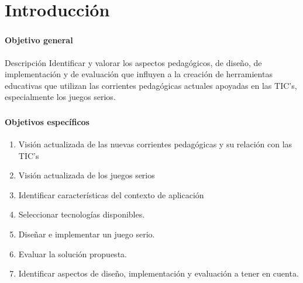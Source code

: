 \section{Introducción}
\setcounter{sectiontotal}{2}

\begin{frame}
\frametitle{\pagetitle}
\framesubtitle{Objetivo general}
\begin{block}{Descripción}
\centering
Identificar y valorar los aspectos pedagógicos, de diseño, de implementación y
de evaluación que influyen a la creación de herramientas educativas que utilizan
las corrientes pedagógicas actuales apoyadas en las TIC's, especialmente los
juegos serios.
\end{block}


\end{frame}

\begin{frame}
\frametitle{\pagetitle}
\framesubtitle{Objetivos específicos}
\begin{enumerate}[<+->]
\item Visión actualizada de las nuevas corrientes pedagógicas y su relación con las TIC's
\item Visión actualizada de los juegos serios
\item Identificar características del contexto de aplicación
\item Seleccionar tecnologías disponibles.
\item Diseñar e implementar un juego serio.
\item Evaluar la solución propuesta.
\item Identificar aspectos de diseño, implementación y evaluación a tener en cuenta.
\end{enumerate}
\end{frame}

